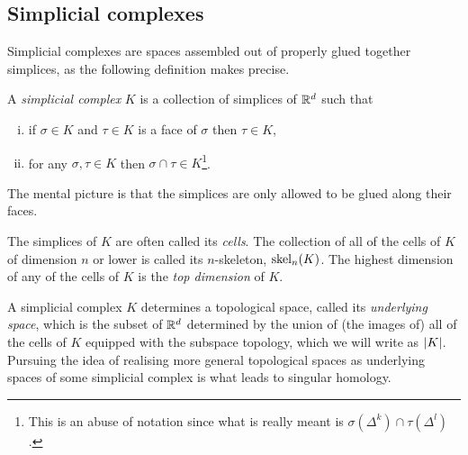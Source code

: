 \documentclass[../main.tex]{subfiles}
\begin{document}
\subsection{Simplicial complexes}
Simplicial complexes are spaces assembled out of properly glued together simplices, as the
following definition makes precise. 
\begin{definition}\label{def:simplicial complex}
	A \emph{simplicial complex} \( K \) is a collection of simplices of \( \mathbb{R}^d \) such that 
	\begin{enumerate}[(i)]
		\item if \( \sigma \in K \) and \( \tau \in K \) is a face of \( \sigma \) then \(
			\tau \in K \),
		\item for any \( \sigma, \tau \in K \) then \( \sigma \cap \tau \in K \)\footnote{This
			is an abuse of notation since what is really meant is \( \sigma(\Delta^k) \cap
		\tau(\Delta^l) \).}. 
	\end{enumerate}
\end{definition}
The mental picture is that the simplices are only allowed to be glued along their faces. 

The simplices of \( K \) are often called its \emph{cells}. The collection of all of the
cells of \( K \) of dimension \( n \) or lower is called its \( n \)-skeleton, \(
\operatorname{skel}_n(K) \). The highest dimension of any of the cells
of \( K \) is the \emph{top dimension} of \( K \). 

A simplicial complex \( K \) determines a topological space, called its \emph{underlying
space}, which is the subset of \( \mathbb{R}^d \) determined by the union of (the images of) all
of the cells of \( K \) equipped with the subspace topology, which we will write as \(
\left\lvert K \right\rvert \). Pursuing the idea of realising more general topological spaces as underlying
spaces of some simplicial complex is what leads to singular homology. 
\end{document}
